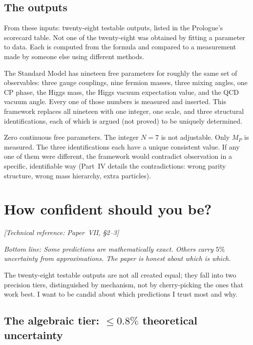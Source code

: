 \subsection*{The outputs}

From these inputs: twenty-eight testable outputs, listed in
the Prologue's scorecard table. Not one of the twenty-eight was obtained by
fitting a parameter to data. Each is computed from the formula and
compared to a measurement made by someone else using different methods.

The Standard
Model has nineteen free parameters for roughly the same set of
observables: three gauge couplings, nine fermion masses, three mixing
angles, one CP phase, the Higgs mass, the Higgs vacuum expectation
value, and the QCD vacuum angle. Every one of those numbers is measured
and inserted. This framework replaces all nineteen with one integer, one
scale, and three structural identifications, each of which is argued
(not proved) to be uniquely determined.

Zero continuous free parameters. The integer $N = 7$ is not adjustable.
Only $M_P$ is measured. The three identifications each have a
unique consistent value. If any one of them were different, the framework
would contradict observation in a specific, identifiable way (Part~IV
details the contradictions: wrong parity structure, wrong mass
hierarchy, extra particles).


\section{How confident should you be?}
\noindent\textit{[Technical reference: Paper~VII, \S2--3]}

\medskip

\noindent\textit{Bottom line: Some predictions are mathematically exact.
Others carry $5\%$ uncertainty from approximations. The paper is honest
about which is which.}

\medskip

The twenty-eight testable outputs are not all created equal; they fall into two
precision tiers, distinguished by mechanism, not by cherry-picking the
ones that work best. I want to be candid about which predictions I
trust most and why.

\subsection*{The algebraic tier: $\le 0.8\%$ theoretical uncertainty}

